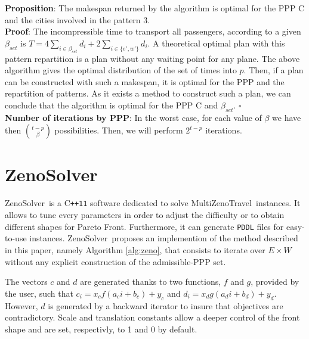 \documentclass{llncs}
\def\MULTIZENO{{\sc MultiZenoTravel}}
\def\ZENOSOLVER{{\sc ZenoSolver}}
\begin{document}
\noindent
{\bf Proposition}: The makespan returned by the algorithm is optimal for the PPP C and the cities involved in the pattern 3.\\

{\bf Proof}: The incompressible time to transport all passengers, according to a given $\beta_{set}$ is $T = 4\underset{i\in \beta_{set}}{\sum} d_i + 2\underset{i\in \{ e',w' \}}{\sum} d_i$. A theoretical optimal plan with this pattern repartition is a plan without any waiting point for any plane.
The above algorithm gives the optimal distribution of the set of times into $p$. Then, if a plan can be constructed with such a makespan, it is optimal for the PPP and the repartition of patterns.
As it exists a method to construct such a plan, we can conclude that the algorithm is optimal for the PPP C and $\beta_{set}$. %
$\square$\\

\noindent
{\bf Number of iterations by PPP}: In the worst case, for each value of $\beta$ we have then ${t-p \choose \beta}$ possibilities. Then, we will perform $2^{t-p}$ iterations. 

\section{\ZENOSOLVER}
\label{sec:zenosolver}
\ZENOSOLVER\ is a C\texttt{++11} software dedicated to solve \MULTIZENO\ instances. It allows to tune every parameters in order to adjust the difficulty or to obtain different shapes for Pareto Front. Furthermore, it can generate \texttt{PDDL} files for easy-to-use instances.
\ZENOSOLVER\ proposes an implemention of the method described in this paper, namely Algorithm \ref{alg:zeno}, that consists to iterate over $E \times W$ without any explicit construction of the admissible-PPP set.

The vectors $c$ and $d$ are generated thanks to two functions, $f$ and $g$, provided by the user, such that $c_i = x_cf(a_ci+b_c)+y_c$ and $d_i = x_dg(a_di+b_d)+y_d$. However, $d$ is generated by a backward iterator to insure that objectives are contradictory. Scale and translation constants allow a deeper control of the front shape and are set, respectivly, to 1 and 0 by default.
\end{document}
